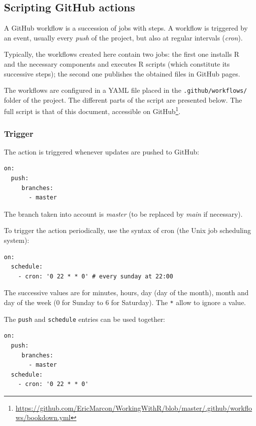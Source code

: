 \documentclass[
  12pt,
  american,
  a4paper,
  extrafontsizes,onecolumn,openright
  ]{memoir}
\begin{document}
\hypertarget{scripting-github-actions}{%
\subsection{Scripting GitHub actions}\label{scripting-github-actions}}

A GitHub workflow is a succession of jobs with steps.
A workflow is triggered by an event, usually every \emph{push} of the project, but also at regular intervals (\emph{cron}).

Typically, the workflows created here contain two jobs: the first one installs R and the necessary components and executes R scripts (which constitute its successive steps); the second one publishes the obtained files in GitHub pages.

The workflows are configured in a YAML file placed in the \texttt{.github/workflows/} folder of the project.
The different parts of the script are presented below.
The full script is that of this document, accessible on GitHub\footnote{\url{https://github.com/EricMarcon/WorkingWithR/blob/master/.github/workflows/bookdown.yml}}.

\hypertarget{sec:declenchement}{%
\subsubsection{Trigger}\label{sec:declenchement}}

The action is triggered whenever updates are pushed to GitHub:

\begin{verbatim}
on:
  push:
     branches:
       - master
\end{verbatim}

The branch taken into account is \emph{master} (to be replaced by \emph{main} if necessary).

To trigger the action periodically, use the syntax of cron (the Unix job scheduling system):

\begin{verbatim}
on:
  schedule:
    - cron: '0 22 * * 0' # every sunday at 22:00
\end{verbatim}

The successive values are for minutes, hours, day (day of the month), month and day of the week (0 for Sunday to 6 for Saturday).
The \texttt{*} allow to ignore a value.

The \texttt{push} and \texttt{schedule} entries can be used together:

\begin{verbatim}
on:
  push:
     branches:
       - master
  schedule:
    - cron: '0 22 * * 0'
\end{verbatim}
\end{document}
